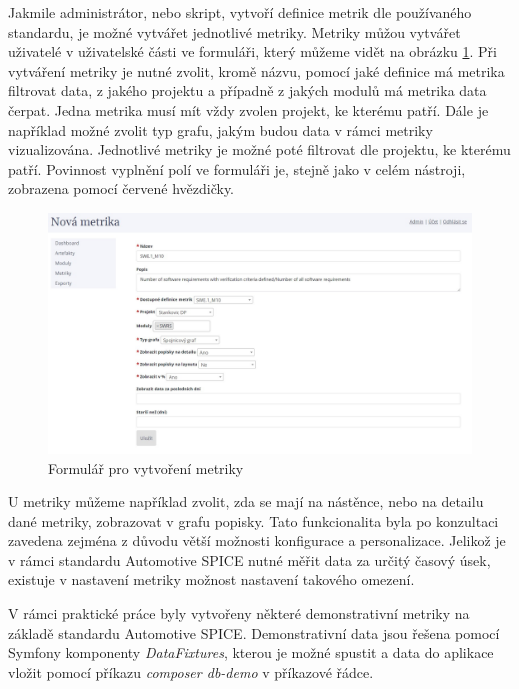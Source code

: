 \documentclass[czech,master]{diploma}
\begin{document}
Jakmile administrátor, nebo skript, vytvoří definice metrik dle používaného standardu, je možné vytvářet jednotlivé metriky. Metriky můžou vytvářet uživatelé v uživatelské části ve formuláři, který můžeme vidět na obrázku \ref{fig:new_metric_from}. Při vytváření metriky je nutné zvolit, kromě názvu, pomocí jaké definice má metrika filtrovat data, z jakého projektu a případně z jakých modulů má metrika data čerpat. Jedna metrika musí mít vždy zvolen projekt, ke kterému patří. Dále je například možné zvolit typ grafu, jakým budou data v rámci metriky vizualizována. Jednotlivé metriky je možné poté filtrovat dle projektu, ke kterému patří. Povinnost vyplnění polí ve formuláři je, stejně jako v celém nástroji, zobrazena pomocí červené hvězdičky.


\begin{figure}[!ht]
    \centering
    \includegraphics[width=1\textwidth]{Diplomka/Figures/new_metric_form.jpg}
    \caption{Formulář pro vytvoření metriky}
    \label{fig:new_metric_from}
\end{figure}

U metriky můžeme například zvolit, zda se mají na nástěnce, nebo na detailu dané metriky, zobrazovat v grafu popisky. Tato funkcionalita byla po konzultaci zavedena zejména z důvodu větší možnosti konfigurace a personalizace. Jelikož je v rámci standardu Automotive SPICE nutné měřit data za určitý časový úsek, existuje v nastavení metriky možnost nastavení takového omezení.

V rámci praktické práce byly vytvořeny některé demonstrativní metriky na základě standardu Automotive SPICE. \cite{ref:metrics_and_dashboard_for_level_two} Demonstrativní data jsou řešena pomocí Symfony komponenty \textit{DataFixtures}, kterou je možné spustit a data do aplikace vložit pomocí příkazu \textit{composer db-demo} v příkazové řádce.
\end{document}
